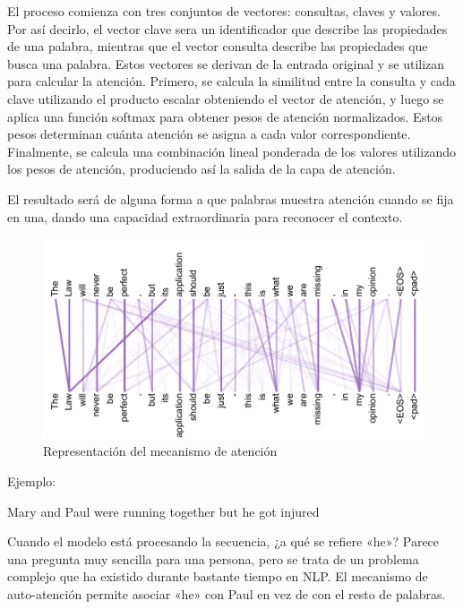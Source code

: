 El proceso comienza con tres conjuntos de vectores: consultas, claves y valores. Por así decirlo, el vector clave sera un identificador que describe las propiedades de una palabra, mientras que el vector consulta describe las propiedades que busca una palabra. Estos vectores se derivan de la entrada original y se utilizan para calcular la atención. Primero, se calcula la similitud entre la consulta y cada clave utilizando el producto escalar obteniendo el vector  de atención, y luego se aplica una función softmax para obtener pesos de atención normalizados. Estos pesos determinan cuánta atención se asigna a cada valor correspondiente. Finalmente, se calcula una combinación lineal ponderada de los valores utilizando los pesos de atención, produciendo así la salida de la capa de atención. 

El resultado será de alguna forma a que palabras muestra atención cuando se fija en una, dando una capacidad extraordinaria para reconocer el contexto.

   
   \begin{figure}[h]
       \centering
       \includegraphics[width=.7\textwidth]{plantilla-libro/img/clave_valor_atencion.png}
       \caption{Representación del mecanismo de atención}
       \label{fig:representacon_atencion}
   \end{figure}
    Ejemplo:
    
    Mary and Paul were running together but he got injured
    
    Cuando el modelo está procesando la secuencia, ¿a qué se refiere «he»? Parece una pregunta muy sencilla para una persona, pero se trata de un problema complejo que ha existido durante bastante tiempo en NLP. El mecanismo de auto-atención permite asociar «he» con Paul en vez de con el resto de palabras.
    

    


